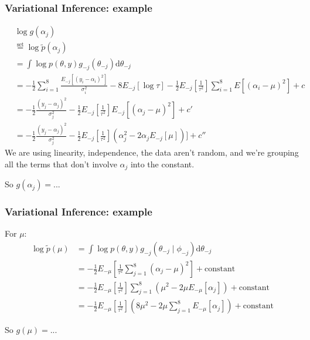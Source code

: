 \documentclass{beamer}
\begin{document}
\begin{frame}[fragile]
\frametitle{Variational Inference: example}


\begin{align*}
&\log g(\alpha_j) \\
&\overset{\text{set}}{=} \log\tilde{p}(\alpha_j) \\
&= \int\log p(\theta, y)g_{-j}(\theta_{-j}) \text{d}\theta_{-j} \\
&= - \frac{1}{2}\sum_{i=1}^8\frac{E_{-j}[(y_i - \alpha_i)^2 ] }{\sigma^2_i } - 8 E_{-j}[\log \tau] - \frac{1}{2} E_{-j}\left[\frac{1}{\tau^2}\right] \sum_{i=1}^8 E[(\alpha_i - \mu)^2 ] + c \\
&= - \frac{1}{2}\frac{(y_j - \alpha_j)^2 }{\sigma^2_j } -  \frac{1}{2} E_{-j}\left[\frac{1}{\tau^2}\right] E_{-j}[(\alpha_j - \mu)^2 ] + c' \\
&= - \frac{1}{2}\frac{(y_j - \alpha_j)^2 }{\sigma^2_j } -  \frac{1}{2} E_{-j}\left[\frac{1}{\tau^2}\right] (\alpha_j^2 - 2\alpha_j E_{-j}[\mu] ) ] + c''
\end{align*}
We are using linearity, independence, the data aren't random, and we're grouping all the terms that don't involve $\alpha_j$ into the constant.
\newline

So $g(\alpha_j) = $...
\end{frame}

\begin{frame}[fragile]
\frametitle{Variational Inference: example}


For $\mu$:
\begin{align*}
\log\tilde{p}(\mu) &= \int\log p(\theta, y)g_{-j}(\theta_{-j} \mid \phi_{-j}) \text{d}\theta_{-j} \\
&= - \frac{1}{2}E_{-\mu}\left[ \frac{1}{\tau^2}\sum_{j=1}^8(\alpha_j - \mu)^2\right] + \text{constant} \\
&= - \frac{1}{2}E_{-\mu}\left[ \frac{1}{\tau^2} \right] \sum_{j=1}^8 \left( \mu^2 - 2 \mu E_{-\mu}[ \alpha_j] \right) + \text{constant} \\
&= - \frac{1}{2}E_{-\mu}\left[ \frac{1}{\tau^2} \right]  \left( 8 \mu^2 - 2 \mu \sum_{j=1}^8 E_{-\mu}[ \alpha_j] \right) + \text{constant}
\end{align*}

So $g(\mu) = $...
\end{frame}
\end{document}
